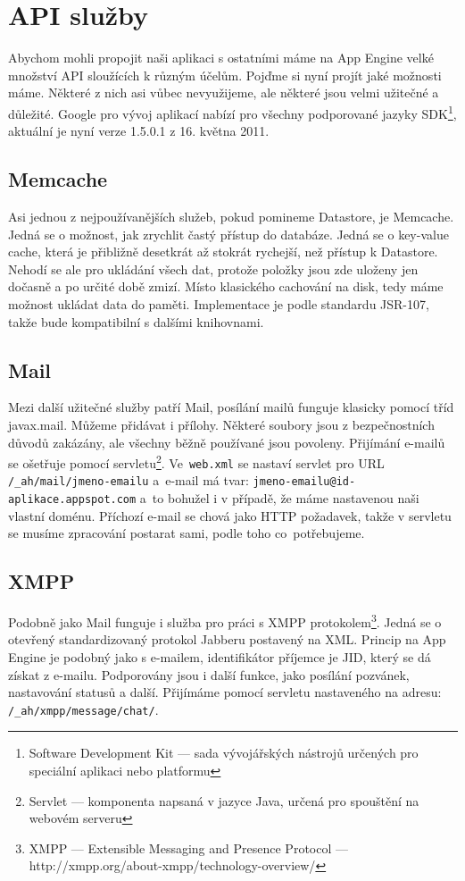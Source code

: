 \section{API služby}
Abychom mohli propojit naši aplikaci s ostatními máme na App Engine velké množství API sloužících k různým účelům. Pojďme si nyní projít jaké možnosti máme. Některé z nich asi vůbec nevyužijeme, ale některé jsou velmi užitečné a důležité. Google pro vývoj aplikací nabízí pro všechny podporované jazyky SDK\footnote{Software Development Kit --- sada vývojářských nástrojů určených pro speciální aplikaci nebo platformu}, aktuální je nyní verze 1.5.0.1 z 16. května 2011.

\subsection{Memcache}
Asi jednou z nejpoužívanějších služeb, pokud pomineme Datastore, je Memcache. Jedná se o možnost, jak zrychlit častý přístup do databáze. Jedná se o key-value cache, která je přibližně desetkrát až stokrát rychejší, než přístup k Datastore. Nehodí se ale pro ukládání všech dat, protože položky jsou zde uloženy jen dočasně a po určité době zmizí. Místo klasického cachování na disk, tedy máme možnost ukládat data do paměti. Implementace je podle standardu JSR-107, takže bude kompatibilní s dalšími knihovnami.

\subsection{Mail}
Mezi další užitečné služby patří Mail, posílání mailů funguje klasicky pomocí tříd javax.mail. Můžeme přidávat i přílohy. Některé soubory jsou z bezpečnostních důvodů zakázány, ale všechny běžně používané jsou povoleny. Přijímání e-mailů se ošetřuje pomocí servletu\footnote{Servlet --- komponenta napsaná v jazyce Java, určená pro spouštění na webovém serveru}. Ve~\verb|web.xml| se nastaví servlet pro URL \\ \verb|/_ah/mail/jmeno-emailu| a~e-mail má tvar: \verb|jmeno-emailu@id-aplikace.appspot.com| a~to bohužel i v případě, že máme nastavenou naši vlastní doménu. Příchozí e-mail se chová jako HTTP požadavek, takže v servletu se musíme zpracování postarat sami, podle toho co~potřebujeme. 

\subsection{XMPP}
Podobně jako Mail funguje i služba pro práci s XMPP protokolem\footnote{XMPP --- Extensible Messaging and Presence Protocol --- http://xmpp.org/about-xmpp/technology-overview/}. Jedná se o otevřený standardizovaný protokol Jabberu postavený na XML. Princip na App Engine je podobný jako s e-mailem, identifikátor příjemce je JID, který se dá získat  z e-mailu. Podporovány jsou i další funkce, jako posílání pozvánek, nastavování statusů a další. Přijímáme pomocí servletu nastaveného na adresu: \verb|/_ah/xmpp/message/chat/|.

